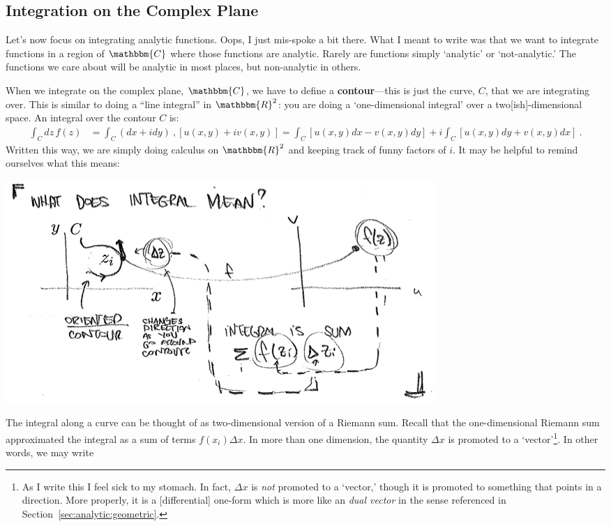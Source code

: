 \subsection{Integration on the Complex Plane}

Let's now focus on integrating analytic functions. Oops, I just mis-spoke a bit there. What I meant to write was that we want to integrate functions in a region of $\mathbbm{C}$ where those functions are analytic. Rarely are functions simply `analytic' or `not-analytic.' The functions we care about will be analytic in most places, but non-analytic in others. 

When we integrate on the complex plane, $\mathbbm{C}$, we have to define a \textbf{contour}---this is just the curve, $C$, that we are integrating over. This is similar to doing a ``line integral'' in $\mathbbm{R}^2$: you are doing a `one-dimensional integral' over a two[ish]-dimensional space. An integral over the contour $C$ is:
\begin{align}
	\int_C dz\, f(z) &= 
	\int_C (dx + i dy) \ , \left[u(x,y)+ i v(x,y)\right]
	= 
	\int_C \left[u(x,y)dx - v(x,y)dy\right] 
	+ i \int_C \left[u(x,y)dy + v(x,y)dx\right] \ .
\end{align}
Written this way, we are simply doing calculus on $\mathbbm{R}^2$ and keeping track of funny factors of $i$. 
%
It may be helpful to remind ourselves what this means:
\begin{center}
\includegraphics[width=\textwidth]{figures/Lec_2017_12_integral.png}
\end{center}
The integral along a curve can be thought of as two-dimensional version of a Riemann sum. Recall that the one-dimensional Riemann sum approximated the integral as a sum of terms $f(x_i)\Delta x$. In more than one dimension, the quantity $\Delta x$ is promoted to a `vector'\footnote{As I write this I feel sick to my stomach. In fact, $\Delta x$ is \emph{not} promoted to a `vector,' though it is promoted to something that points in a direction. More properly, it is a [differential] one-form which is more like an \emph{dual vector} in the sense referenced in Section~\ref{sec:analytic:geometric}.}. In other words, we may write
